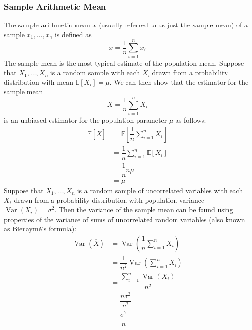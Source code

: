 \documentclass[11pt]{report} %
\begin{document}
\subsubsection{Sample Arithmetic Mean}

The sample arithmetic mean $\overline{x}$ (usually referred to as just the sample mean) of a sample $x_{1}, \dots, x_{n}$ is defined as
\begin{equation}
\overline{x} = \dfrac{1}{n}\sum_{i = 1}^{n}x_{i}
\end{equation}
The sample mean is the most typical estimate of the population mean. Suppose that $X_{1}, \dots, X_{n}$ is a random sample with each $X_{i}$ drawn from a probability distribution with mean $\mathbb{E}\left[X_{i}\right] = \mu$. We can then show that the estimator for the sample mean
\begin{equation}
\overline{X} = \dfrac{1}{n}\sum_{i = 1}^{n}X_{i}
\end{equation}
is an unbiased estimator for the population parameter $\mu$ as follows:
\begin{align}
\mathbb{E}\left[\overline{X}\right] &= \mathbb{E}\left[\dfrac{1}{n}\sum_{i = 1}^{n}X_{i}\right] \\
&= \dfrac{1}{n}\sum_{i = 1}^{n}\mathbb{E}\left[X_{i}\right] \\
&= \dfrac{1}{n}n\mu \\
&= \mu
\end{align}
Suppose that $X_{1}, \dots, X_{n}$ is a random sample of uncorrelated variables with each $X_{i}$ drawn from a probability distribution with population variance $\operatorname{Var}\left(X_{i}\right) = \sigma^{2}$. Then the variance of the sample mean can be found using properties of the variance of sums of uncorrelated random variables (also known as Bienaym\'{e}'s formula):
\begin{align}
\operatorname{Var}\left(\overline{X}\right) &= \operatorname{Var}\left(\dfrac{1}{n}\sum_{i = 1}^{n}X_{i}\right) \\
&= \dfrac{1}{n^{2}}\operatorname{Var}\left(\sum_{i = 1}^{n}X_{i}\right) \\
&= \dfrac{\sum_{i = 1}^{n}\operatorname{Var}\left(X_{i}\right)}{n^{2}} \\
&= \dfrac{n\sigma^{2}}{n^{2}} \\
&= \dfrac{\sigma^{2}}{n}
\end{align}
\end{document}

